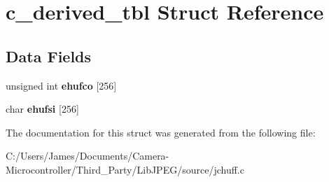 \hypertarget{structc__derived__tbl}{}\section{c\+\_\+derived\+\_\+tbl Struct Reference}
\label{structc__derived__tbl}
\subsection*{Data Fields}
\begin{DoxyCompactItemize}
\item 
\mbox{\label{structc__derived__tbl_a7b0e37a18bfb12a62f2fdd934d9ba060}} 
unsigned int {\bfseries ehufco} \mbox{[}256\mbox{]}
\item 
\mbox{\label{structc__derived__tbl_a68510cff3aec83be0202d6fbeb1d96b8}} 
char {\bfseries ehufsi} \mbox{[}256\mbox{]}
\end{DoxyCompactItemize}


The documentation for this struct was generated from the following file\+:\begin{DoxyCompactItemize}
\item 
C\+:/\+Users/\+James/\+Documents/\+Camera-\/\+Microcontroller/\+Third\+\_\+\+Party/\+Lib\+J\+P\+E\+G/source/jchuff.\+c\end{DoxyCompactItemize}
